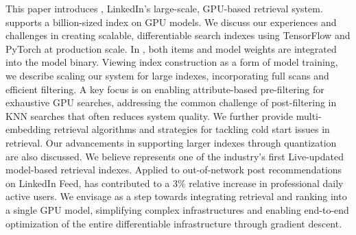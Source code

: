 
This paper introduces {\systemname}, LinkedIn's large-scale, GPU-based retrieval system. {\systemname} supports a billion-sized index on GPU models. We discuss our experiences and challenges in creating scalable, differentiable search indexes using TensorFlow and PyTorch at production scale. In {\systemname}, both items and model weights are integrated into the model binary. Viewing index construction as a form of model training, we describe scaling our system for large indexes, incorporating full scans and efficient filtering. A key focus is on enabling attribute-based pre-filtering for exhaustive GPU searches, addressing the common challenge of post-filtering in KNN searches that often reduces system quality. We further provide multi-embedding retrieval algorithms and strategies for tackling cold start issues in retrieval. Our advancements in supporting larger indexes through quantization are also discussed. We believe {\systemname} represents one of the industry's first Live-updated model-based retrieval indexes. Applied to out-of-network post recommendations on LinkedIn Feed, {\systemname} has contributed to a 3\% relative increase in professional daily active users. We envisage {\systemname} as a step towards integrating retrieval and ranking into a single GPU model, simplifying complex infrastructures and enabling end-to-end optimization of the entire differentiable infrastructure through gradient descent.




